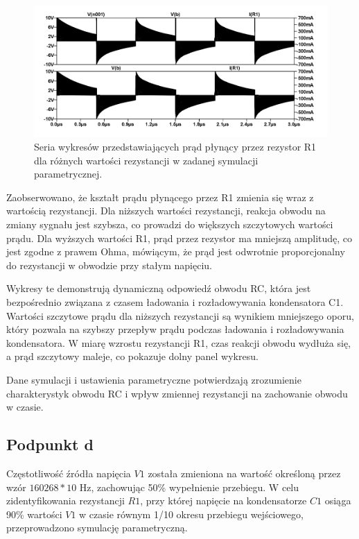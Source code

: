 \documentclass[10pt]{article}
\begin{document}
	\begin{figure}[H]
		\centering
		\includegraphics[width=\linewidth]{3cwykres}
		\caption{Seria wykresów przedstawiających prąd płynący przez rezystor R1 dla różnych wartości rezystancji w zadanej symulacji parametrycznej.}
		\label{fig:3cwykres}
	\end{figure}
	
	Zaobserwowano, że kształt prądu płynącego przez R1 zmienia się wraz z wartością rezystancji. Dla niższych wartości rezystancji, reakcja obwodu na zmiany sygnału jest szybsza, co prowadzi do większych szczytowych wartości prądu. Dla wyższych wartości R1, prąd przez rezystor ma mniejszą amplitudę, co jest zgodne z prawem Ohma, mówiącym, że prąd jest odwrotnie proporcjonalny do rezystancji w obwodzie przy stałym napięciu.
	
	Wykresy te demonstrują dynamiczną odpowiedź obwodu RC, która jest bezpośrednio związana z czasem ładowania i rozładowywania kondensatora C1. Wartości szczytowe prądu dla niższych rezystancji są wynikiem mniejszego oporu, który pozwala na szybszy przepływ prądu podczas ładowania i rozładowywania kondensatora. W miarę wzrostu rezystancji R1, czas reakcji obwodu wydłuża się, a prąd szczytowy maleje, co pokazuje dolny panel wykresu.
	
	Dane symulacji i ustawienia parametryczne potwierdzają zrozumienie charakterystyk obwodu RC i wpływ zmiennej rezystancji na zachowanie obwodu w czasie.
	
	\pagebreak
	\subsection*{Podpunkt d}
	Częstotliwość źródła napięcia $V1$ została zmieniona na wartość określoną przez wzór $160268*10$ Hz, zachowując 50\% wypełnienie przebiegu. W celu zidentyfikowania rezystancji $R1$, przy której napięcie na kondensatorze $C1$ osiąga 90\% wartości $V1$ w czasie równym 1/10 okresu przebiegu wejściowego, przeprowadzono symulację parametryczną.
	
\end{document}

